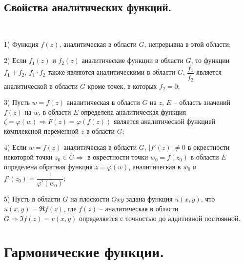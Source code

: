 \documentclass[9pt]{article}
\begin{document}
\subsection{Свойства аналитических функций.}

\ 
\par1) Функция \(f(z)\), аналитическая в области \(G\), непрерывна в этой области;
\par2) Если \(f_1(z)\) и \(f_2(z)\) аналитические функции в области \(G\), то функции \(f_1+f_2,\ f_1\cdot f_2\) также являются аналитическими в области \(G\), \(\dfrac{f_1}{f_2}\) является аналитической в области \(G\) кроме точек, в которых \(f_2=0\);
\par3) Пусть \(w=f(z)\) аналитическая в области \(G\) на \(z\), \(E\) -- область значений \(f(z)\) на \(w\), в области \(E\) определена аналитическая функция \(\zeta=\varphi(w)\Rightarrow F(z)=\varphi(f(z))\) является аналитической функцией комплексной переменной \(z\) в области \(G\);
\par4) Если \(w=f(z)\) аналитическая в области \(G\), \(|f'(z)|\neq0\) в окрестности некоторой точки \(z_0\in G\Rightarrow\) в окрестности точки \(w_0=f(z_0)\) в области \(E\) определена обратная функция \(z=\varphi(w)\), аналитическая в \(w_0\) и \(f'(z_0)=\dfrac{1}{\varphi'(w_0)}\);
\par5) Пусть в области \(G\) на плоскости \(Oxy\) задана функция \(u(x,y)\), что \(u(x,y)=\Re f(z)\), где \(f(z)\) -- аналитическая в области \(G \Rightarrow \Im f(z)=v(x,y)\) определяется с точностью до аддитивной постоянной.

\section{Гармонические функции.}
\end{document}
